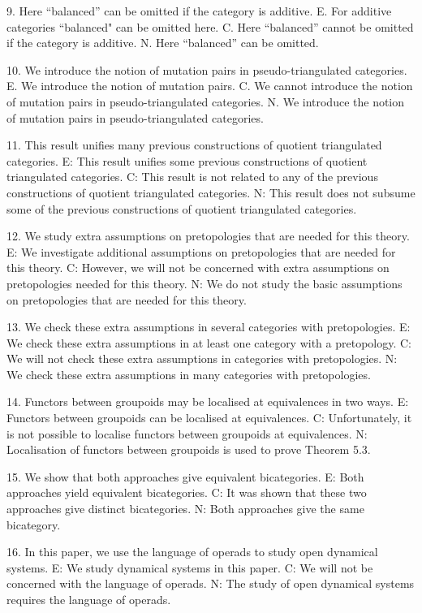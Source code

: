 9. Here ``balanced'' can be omitted if the category is additive.
E. For additive categories ``balanced" can be omitted here.
C. Here ``balanced'' cannot be omitted if the category is additive.
N. Here ``balanced'' can be omitted.

10. We introduce the notion of mutation pairs in pseudo-triangulated categories.
E. We introduce the notion of mutation pairs.
C. We cannot introduce the notion of mutation pairs in pseudo-triangulated categories.
N. We introduce the notion of mutation pairs in pseudo-triangulated categories.

11. This result unifies many previous constructions of quotient triangulated categories.
E: This result unifies some previous constructions of quotient triangulated categories.
C: This result is not related to any of the previous constructions of quotient triangulated categories.
N: This result does not subsume some of the previous constructions of quotient triangulated categories.

12. We study extra assumptions on pretopologies that are needed for this theory.
E: We investigate additional assumptions on pretopologies that are needed for this theory.
C: However, we will not be concerned with extra assumptions on pretopologies needed for this theory.
N: We do not study the basic assumptions on pretopologies that are needed for this theory.

13. We check these extra assumptions in several categories with pretopologies.
E: We check these extra assumptions in at least one category with a pretopology.
C: We will not check these extra assumptions in categories with pretopologies.
N: We check these extra assumptions in many categories with pretopologies.

14. Functors between groupoids may be localised at equivalences in two ways.
E: Functors between groupoids can be localised at equivalences.
C: Unfortunately, it is not possible to localise functors between groupoids at equivalences.
N: Localisation of functors between groupoids is used to prove Theorem 5.3.

15. We show that both approaches give equivalent bicategories.
E: Both approaches yield equivalent bicategories.
C: It was shown that these two approaches give distinct bicategories.
N: Both approaches give the same bicategory.

16. In this paper, we use the language of operads to study open dynamical systems.
E: We study dynamical systems in this paper.
C: We will not be concerned with the language of operads.
N: The study of open dynamical systems requires the language of operads.

